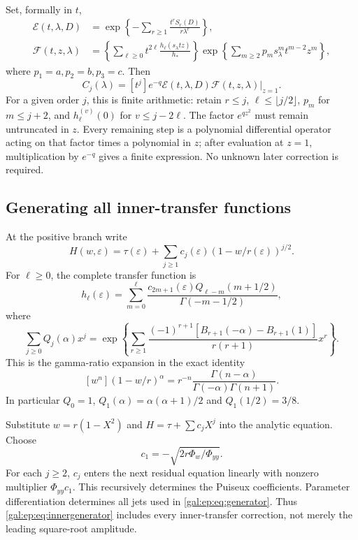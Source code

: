 \documentclass[11pt,letterpaper]{article}
\numberwithin{equation}{section}
\theoremstyle{definition}\newtheorem{definition}[theorem]{Definition}
\theoremstyle{remark}\newtheorem{remark}[theorem]{Remark}
\newcommand{\eps}{\varepsilon}
\newcommand{\coef}[1]{\left[#1\right]}
\begin{document}
Set, formally in $t$,
\begin{align}\label{gal:ep:eq:E}
\mathcal E(t,\lambda,D)
&=\exp\!\left\{-\sum_{r\ge1}\frac{t^rS_r(D)}{r\lambda^r}\right\},\\
\mathcal F(t,z,\lambda)
&=\left\{\sum_{\ell\ge0}t^{2\ell}\frac{h_\ell(s_\lambda tz)}{h_*}\right\}
\exp\!\left\{\sum_{m\ge2}p_m s_\lambda^m t^{m-2}z^m\right\},\label{gal:ep:eq:F}
\end{align}
where $p_1=a,p_2=b,p_3=c$. Then
\begin{equation}\label{gal:ep:eq:generator}
\boxed{\quad C_j(\lambda)=\coef{t^j}e^{-q}
 \left.\mathcal E(t,\lambda,D)\mathcal F(t,z,\lambda)\right|_{z=1}.\quad}
\end{equation}
For a given order $j$, this is finite arithmetic: retain $r\le j$, $\ell\le\lfloor j/2\rfloor$, $p_m$ for $m\le j+2$, and $h_\ell^{(v)}(0)$ for $v\le j-2\ell$. The factor $e^{qz^2}$ must remain untruncated in $z$. Every remaining step is a polynomial differential operator acting on that factor times a polynomial in $z$; after evaluation at $z=1$, multiplication by $e^{-q}$ gives a finite expression. No unknown later correction is required.

\subsection{Generating all inner-transfer functions}
At the positive branch write
\[
H(w,\eps)=\tau(\eps)+\sum_{j\ge1}c_j(\eps)
 (1-w/r(\eps))^{j/2}.
\]
For $\ell\ge0$, the complete transfer function is
\begin{equation}\label{gal:ep:eq:innergenerator}
h_\ell(\eps)=\sum_{m=0}^{\ell}
\frac{c_{2m+1}(\eps)Q_{\ell-m}(m+1/2)}{\Gamma(-m-1/2)},
\end{equation}
where
\begin{equation}\label{gal:ep:eq:Qgenerator}
\sum_{j\ge0}Q_j(\alpha)x^j
=\exp\!\left\{\sum_{r\ge1}
\frac{(-1)^{r+1}[B_{r+1}(-\alpha)-B_{r+1}(1)]}{r(r+1)}x^r\right\}.
\end{equation}
This is the gamma-ratio expansion in the exact identity
\[
\coef{w^n}(1-w/r)^\alpha
=r^{-n}\frac{\Gamma(n-\alpha)}{\Gamma(-\alpha)\Gamma(n+1)}.
\]
In particular $Q_0=1$, $Q_1(\alpha)=\alpha(\alpha+1)/2$ and $Q_1(1/2)=3/8$.

Substitute $w=r(1-X^2)$ and $H=\tau+\sum c_jX^j$ into the analytic equation. Choose
\[
c_1=-\sqrt{2r\Phi_w/\Phi_{yy}}.
\]
For each $j\ge2$, $c_j$ enters the next residual equation linearly with nonzero multiplier $\Phi_{yy}c_1$. This recursively determines the Puiseux coefficients. Parameter differentiation determines all jets used in \eqref{gal:ep:eq:generator}. Thus \eqref{gal:ep:eq:innergenerator} includes every inner-transfer correction, not merely the leading square-root amplitude.
\end{document}
